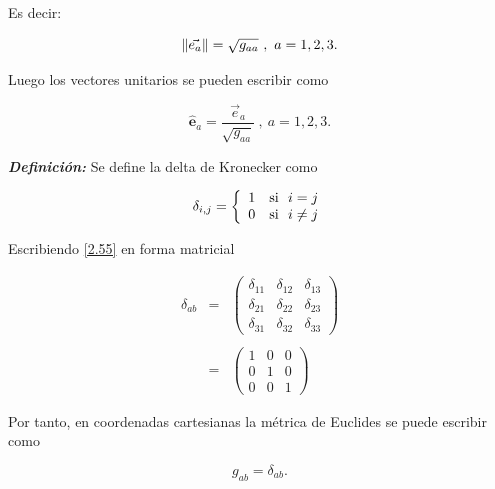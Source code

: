 \documentclass[12pt]{report}
\DeclarePairedDelimiter\norm{\lVert}{\rVert}
\newcommand{\uvec}[1]{\boldsymbol{\hat{\text{#1}}}}
\begin{document}
Es decir:

\begin{equation}
\norm{\vec{e_a}}= \sqrt{g_{aa}} \ , \ a = 1,2,3.
\end{equation}

Luego los vectores unitarios se pueden escribir como 

\begin{equation} \label{2.54}
\uvec{e}_a = \frac{\vec{e}_a}{\sqrt{g_{aa}}} \ , \ a=1,2,3.
\end{equation}



\textbf{\textit{Definición:}} Se define la delta de Kronecker como

\begin{eqnarray} \label{2.55}
 \delta_{i,j} =
\left\{ \begin{array}{ccc} 
 1 & {\rm  si~~} i=j   \\ 
 0 & {\rm  si~~} i\ne j  \\  
\end{array} \right.
\end{eqnarray}

Escribiendo \eqref{2.55} en forma matricial 

\begin{eqnarray} \nonumber
 \delta_{ab} &=&
\left( \begin{array}{cccc} 
 \delta_{11} & \delta_{12} & \delta_{13}  \\ 
 \delta_{21} & \delta_{22} & \delta_{23} \\
 \delta_{31} & \delta_{32} & \delta_{33}  
\end{array} \right) \\ \nonumber
\\  
&=& \left( \begin{array}{cccc}  \label{2.56}
 1 & 0 & 0  \\ 
 0 & 1 & 0 \\ 
 0 & 0 & 1  
\end{array} \right) 
\end{eqnarray}


Por tanto, en coordenadas cartesianas la métrica de Euclides se puede escribir como

\begin{equation}
g_{ab}=\delta_{ab}.
\end{equation}
\end{document}
